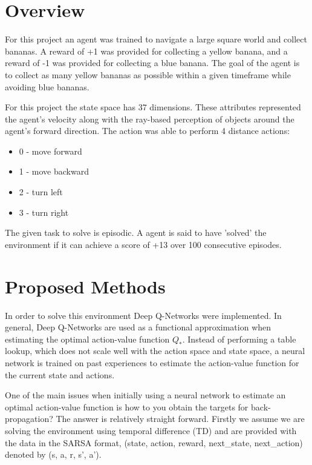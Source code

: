 \documentclass[12pt]{article}
\begin{document}
\maketitle


\section{Overview}
For this project an agent was trained to navigate a large square world and collect bananas.
A reward of +1 was provided for collecting a yellow banana, and a reward of -1 was provided for collecting a blue banana.
The goal of the agent is to collect as many yellow bananas as possible within a given timeframe while avoiding blue bananas.

For this project the state space has 37 dimensions. These attributes represented the agent's velocity along with the ray-based perception
of objects around the agent's forward direction.
The action was able to perform 4 distance actions:

\begin{itemize}
\item 0 - move forward
\item 1 - move backward
\item 2 - turn left
\item 3 - turn right
\end{itemize}

The given task to solve is episodic. 
A agent is said to have 'solved' the environment if it can achieve a score of +13 over 100 consecutive episodes.

\section{Proposed Methods}
\label{methods}
In order to solve this environment Deep Q-Networks \cite{deep_q_networks} were implemented.
In general, Deep Q-Networks are used as a functional approximation  when estimating the optimal action-value function $Q_*$.
Instead of performing a table lookup, which does not scale well with the action space and state space, a neural network is trained
on past experiences to estimate the action-value function for the current state and actions.

One of the main issues when initially using a neural network to estimate an optimal action-value function 
is how to you obtain the targets for back-propagation?
The answer is relatively straight forward.
Firstly we assume we are solving the environment using temporal difference (TD) and are provided with the data in 
the SARSA format, (state, action, reward, next\_state, next\_action) denoted by (s, a, r, s', a').
\end{document}
